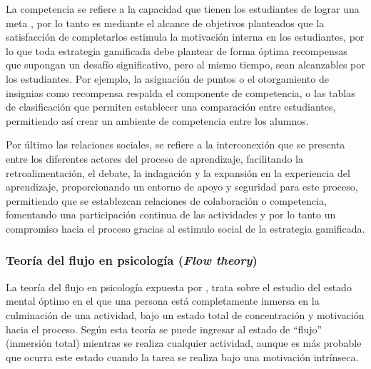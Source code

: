 La competencia se refiere a la capacidad que tienen los estudiantes de lograr una meta \cite{Rutledge2018}, 
por lo tanto es mediante el alcance de objetivos planteados que la satisfacción de completarlos estimula la 
motivación interna en los estudiantes, por lo que toda estrategia gamificada debe plantear de forma óptima 
recompensas que supongan un desafío significativo, pero al mismo tiempo, sean alcanzables por los estudiantes. 
Por ejemplo, la asignación de puntos o el otorgamiento de insignias como recompensa respalda el componente de 
competencia, o las tablas de clasificación que permiten establecer una comparación entre estudiantes, 
permitiendo así crear un ambiente de competencia entre los alumnos.

Por último las relaciones sociales, se refiere a la interconexión que se presenta entre los diferentes actores 
del proceso de aprendizaje, facilitando la retroalimentación, el debate, la indagación y la expansión en la 
experiencia del aprendizaje, proporcionando un entorno de apoyo y seguridad para este proceso, permitiendo que 
se establezcan relaciones de colaboración o competencia, fomentando una participación continua de las 
actividades y por lo tanto un compromiso hacia el proceso gracias al estimulo social de la estrategia 
gamificada.

\subsubsection{Teoría del flujo en psicología (\textit{Flow theory})}

La teoría del flujo en psicología expuesta por , trata sobre el estudio del estado 
mental óptimo en el que una persona está completamente inmersa en la culminación de una actividad, bajo un
estado total de concentración y motivación hacia el proceso. Según esta teoría se puede ingresar al estado de 
``flujo'' (inmersión total) mientras se realiza cualquier actividad, aunque es más probable que ocurra este
estado cuando la tarea se realiza bajo una motivación intrínseca.

